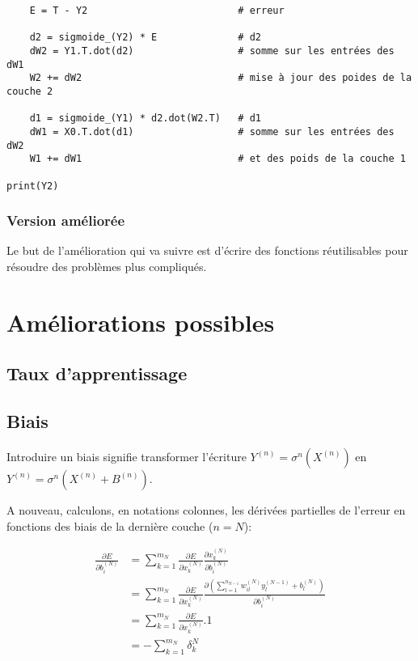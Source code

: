 \documentclass[11pt]{article}
\begin{document}
{\begin{verbatim}
    E = T - Y2                          # erreur

    d2 = sigmoide_(Y2) * E              # d2  
    dW2 = Y1.T.dot(d2)                  # somme sur les entrées des dW1
    W2 += dW2                           # mise à jour des poides de la couche 2

    d1 = sigmoide_(Y1) * d2.dot(W2.T)   # d1 
    dW1 = X0.T.dot(d1)                  # somme sur les entrées des dW2
    W1 += dW1                           # et des poids de la couche 1

print(Y2)
\end{verbatim}

\subsubsection{Version améliorée}
\label{sec-7-2-2}

Le but de l'amélioration qui va suivre est d'écrire des fonctions réutilisables
pour résoudre des problèmes plus compliqués.

\section{Améliorations possibles}
\label{sec-8}

\subsection{Taux d'apprentissage}
\label{sec-8-1}

\subsection{Biais}
\label{sec-8-2}

Introduire un biais signifie transformer l'écriture
$Y^{(n)}=\sigma^{n}(X^{(n)})$ en $Y^{(n)}=\sigma^{n}(X^{(n)}+B^{(n)})$.

A nouveau, calculons, en notations colonnes, les dérivées partielles de l'erreur
en fonctions des biais de la dernière couche ($n=N$):

\begin{align}
\frac{\partial E}{\partial b_{i}^{(N)}}
& = \sum_{k=1}^{m_{N}}\frac{\partial E}{\partial x_{k}^{(N)}}
\frac{\partial x_{k}^{(N)}}{\partial b_{i}^{(N)}}\\
& = \sum_{k=1}^{m_{N}}\frac{\partial E}{\partial x_{k}^{(N)}}
\frac{\partial (\sum_{l=1}^{n_{N-1}}w_{il}^{(N)}y_{l}^{(N-1)}+b_{l}^{(N)})}
{\partial b_{i}^{(N)}}\\
& = \sum_{k=1}^{m_{N}}\frac{\partial E}{\partial x_{k}^{(N)}}.1\\
& = -\sum_{k=1}^{m_{N}}\delta_{k}^{N}
\end{align}

}
\end{document}
